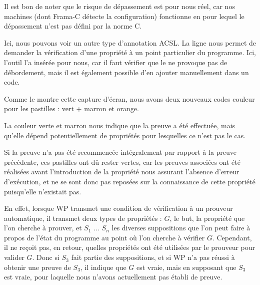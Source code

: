 

\begin{Information}
Il est bon de noter que le risque de dépassement est pour nous réel, car nos
machines (dont Frama-C détecte la configuration) fonctionne en
pour lequel le dépassement n'est pas défini par la norme C.
\end{Information}


Ici, nous pouvons voir un autre type d'annotation ACSL. La
ligne  nous permet de demander la vérification
d'une propriété à un point particulier du programme. Ici, l'outil l'a
insérée pour nous, car il faut vérifier que le  ne provoque pas de
débordement, mais il est également possible d'en ajouter manuellement dans
un code.



Comme le montre cette capture d'écran, nous avons deux nouveaux codes couleur
pour les pastilles : vert + marron et orange.



La couleur verte et marron nous indique que la preuve a été effectuée, mais
qu'elle dépend potentiellement de propriétés pour lesquelles ce n'est pas le
cas.



Si  la preuve n'a pas été recommencée intégralement par rapport à la preuve
précédente, ces pastilles ont dû rester vertes, car les preuves associées ont
été réalisées avant l'introduction de la propriété nous assurant l'absence
d'erreur d'exécution, et ne se sont donc pas reposées sur la connaissance de
cette propriété puisqu'elle n'existait pas.



En effet, lorsque WP transmet une condition de vérification à un prouveur
automatique, il transmet deux types de propriétés : $G$, le but, la propriété
que l'on cherche à prouver, et $S_1$ ... $S_n$ les diverses suppositions que l'on
peut faire à propos de l'état du programme au point où l'on cherche à vérifier $G$.
Cependant, il ne reçoit pas, en retour, quelles propriétés ont été utilisées par
le prouveur pour valider $G$. Donc si $S_3$ fait partie des suppositions, et si
WP n'a pas réussi à obtenir une preuve de $S_3$, il indique que $G$ est vraie, mais
en supposant que $S_3$ est vraie, pour laquelle nous n'avons actuellement pas
établi de preuve.



